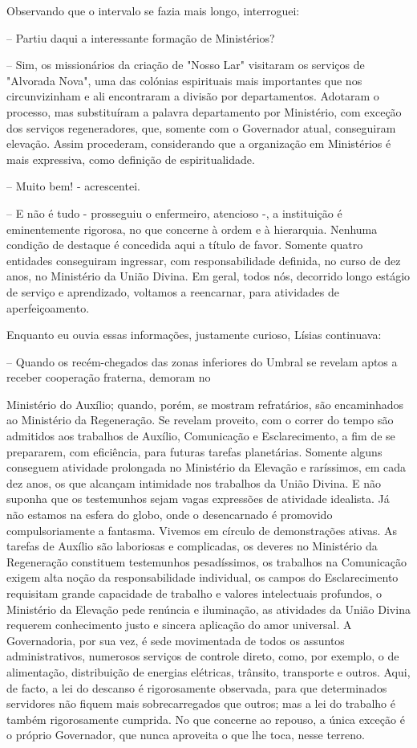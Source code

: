 \documentclass[portuguese,12pt,a4paper]{scrbook}
\begin{document}
	Observando que o intervalo se fazia mais longo, interroguei:
	
	– Partiu daqui a interessante formação de Ministérios?
	
	– Sim, os missionários da criação de "Nosso Lar" visitaram os serviços de "Alvorada Nova", uma das colónias espirituais mais importantes que nos circunvizinham e ali encontraram a divisão por departamentos. Adotaram o processo, mas substituíram a palavra departamento por Ministério, com exceção dos serviços regeneradores, que, somente com o Governador atual, conseguiram elevação. Assim procederam, considerando que a organização em Ministérios é mais expressiva, como definição de espiritualidade.
	
	– Muito bem! - acrescentei.
	
	– E não é tudo - prosseguiu o enfermeiro, atencioso -, a instituição é eminentemente rigorosa, no que concerne à ordem e à hierarquia. Nenhuma condição de destaque é concedida aqui a título de favor. Somente quatro entidades conseguiram ingressar, com responsabilidade definida, no curso de dez anos, no Ministério da União Divina. Em geral, todos nós, decorrido longo estágio de serviço e aprendizado, voltamos a reencarnar, para atividades de aperfeiçoamento.
	
	Enquanto eu ouvia essas informações, justamente curioso, Lísias continuava:
	
	– Quando os recém-chegados das zonas inferiores do Umbral se revelam aptos a receber cooperação fraterna, demoram no
	
	
	Ministério do Auxílio; quando, porém, se mostram refratários, são encaminhados ao Ministério da Regeneração. Se revelam proveito, com o correr do tempo são admitidos aos trabalhos de Auxílio, Comunicação e Esclarecimento, a fim de se prepararem, com eficiência, para futuras tarefas planetárias. Somente alguns conseguem atividade prolongada no Ministério da Elevação e raríssimos, em cada dez anos, os que alcançam intimidade nos trabalhos da União Divina. E não suponha que os testemunhos sejam vagas expressões de atividade idealista. Já não estamos na esfera do globo, onde o desencarnado é promovido compulsoriamente a fantasma. Vivemos em círculo de demonstrações ativas. As tarefas de Auxílio são laboriosas e complicadas, os deveres no Ministério da Regeneração constituem testemunhos pesadíssimos, os trabalhos na Comunicação exigem alta noção da responsabilidade individual, os campos do Esclarecimento requisitam grande capacidade de trabalho e valores intelectuais profundos, o Ministério da Elevação pede renúncia e iluminação, as atividades da União Divina requerem conhecimento justo e sincera aplicação do amor universal. A Governadoria, por sua vez, é sede movimentada de todos os assuntos administrativos, numerosos serviços de controle direto, como, por exemplo, o de alimentação, distribuição de energias elétricas, trânsito, transporte e outros. Aqui, de facto, a lei do descanso é rigorosamente observada, para que determinados servidores não fiquem mais sobrecarregados que outros; mas a lei do trabalho é também rigorosamente cumprida. No que concerne ao repouso, a única exceção é o próprio Governador, que nunca aproveita o que lhe toca, nesse terreno.
	
\end{document}
